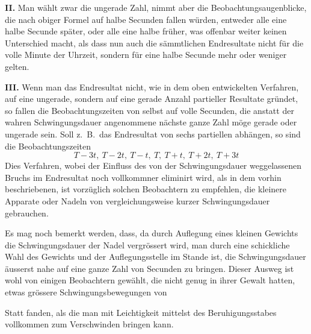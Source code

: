 \documentclass[12pt,a4paper]{article}
\begin{document}
\textbf{II.} Man w\"ahlt zwar die ungerade Zahl, nimmt aber die Beobachtungsaugenblicke, die nach obiger Formel auf halbe Secunden fallen w\"urden, entweder alle eine halbe Secunde sp\"ater, oder alle eine halbe fr\"uher, was offenbar weiter keinen Unterschied macht, als dass nun auch die s\"ammtlichen Endresultate nicht f\"ur die volle Minute der Uhrzeit, sondern f\"ur eine halbe Secunde mehr oder weniger gelten.

\textbf{III.} Wenn man das Endresultat nicht, wie in dem oben entwickelten Verfahren, auf eine ungerade, sondern auf eine gerade Anzahl partieller Resultate gr\"undet, so fallen die Beobachtungszeiten von selbst auf volle Secunden, die anstatt der wahren Schwingungsdauer angenommene n\"achste ganze Zahl m\"oge gerade oder ungerade sein. Soll z.~B.\ das Endresultat von sechs partiellen abh\"angen, so sind die Beobachtungszeiten
\[T-3t,\ T-2t,\ T-t,\ T,\ T+t,\ T+2t,\ T+3t\]
Dies Verfahren, wobei der Einfluss des von der Schwingungsdauer weggelassenen Bruchs im Endresultat noch vollkommner eliminirt wird, als in dem vorhin beschriebenen, ist vorz\"uglich solchen Beobachtern zu empfehlen, die kleinere Apparate oder Nadeln von vergleichungsweise kurzer Schwingungsdauer gebrauchen.

Es mag noch bemerkt werden, dass, da durch Auflegung eines kleinen Gewichts die Schwingungsdauer der Nadel vergr\"ossert wird, man durch eine schickliche Wahl des Gewichts und der Auflegungsstelle im Stande ist, die Schwingungsdauer \"ausserst nahe auf eine ganze Zahl von Secunden zu bringen. Dieser Ausweg ist wohl von einigen Beobachtern gew\"ahlt, die nicht genug in ihrer Gewalt hatten, etwas gr\"ossere Schwingungsbewegungen von

\newpage
\noindent
Statt fanden, als die man mit Leichtigkeit mittelst des Beruhigungsstabes vollkommen zum Verschwinden bringen kann.
\end{document}
